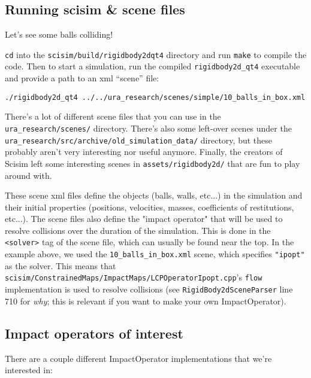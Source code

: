 \documentclass[12pt]{article}
\begin{document}
\subsection{Running scisim \& scene files}

Let's see some balls colliding!

\texttt{cd} into the \texttt{scisim/build/rigidbody2dqt4} directory and run \texttt{make} to compile the code.
Then to start a simulation, run the compiled \texttt{rigidbody2d\_qt4} executable and provide a path to an xml ``scene'' file:
\\\begin{verbatim}
./rigidbody2d_qt4 ../../ura_research/scenes/simple/10_balls_in_box.xml
\end{verbatim}

There's a lot of different scene files that you can use in the \texttt{ura\_research/scenes/} directory.
There's also some left-over scenes under the
\\\texttt{ura\_research/src/archive/old\_simulation\_data/} directory,
but these probably aren't very interesting nor useful anymore.
Finally, the creators of Scisim left some interesting scenes in \texttt{assets/rigidbody2d/} that are fun to play around with.

These scene xml files define the objects (balls, walls, etc...) in the simulation and their initial properties
(positions, velocities, masses, coefficients of restitutions, etc...).
The scene files also define the "impact operator" that will be used to resolve collisions over the duration of the simulation.
This is done in the \texttt{<solver>} tag of the scene file, which can usually be found near the top.
In the example above, we used the \texttt{10\_balls\_in\_box.xml} scene,
which specifies \texttt{"ipopt"} as the solver.
This means that
\\\texttt{scisim/ConstrainedMaps/ImpactMaps/LCPOperatorIpopt.cpp}'s \texttt{flow}
implementation is used to resolve collisions
(see \texttt{RigidBody2dSceneParser} line 710 for \textit{why};
this is relevant if you want to make your own ImpactOperator).

\subsection{Impact operators of interest}

There are a couple different ImpactOperator implementations that we're interested in:
\end{document}

